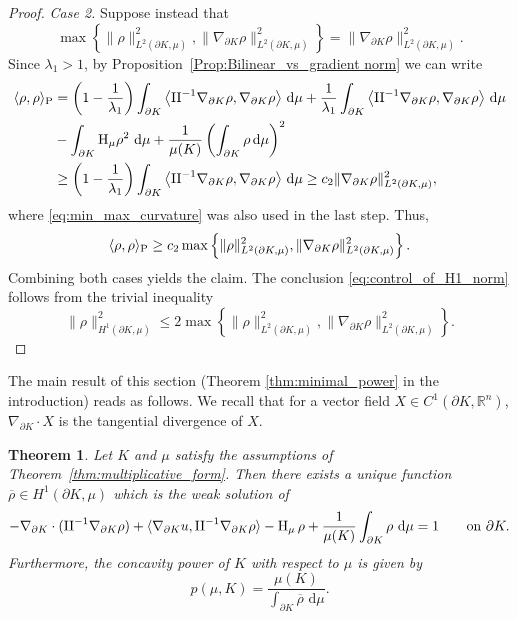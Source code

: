 \documentclass[a4paper, 11pt]{article}
\newcommand{\R}{\mathbb{R}}
\newtheorem{theorem}{Theorem}[section]
\theoremstyle{definition}
\newcommand{\di}{\, \mathrm{d}}
\begin{document}
\begin{proof}
\smallskip
\noindent
\emph{Case 2.}
Suppose instead that
\[\max\left\{\|\rho\|^2_{L^2(\partial K, \mu)},\|\nabla_{\partial K}\rho\|^2_{L^2(\partial K, \mu)}\right\}=\|\nabla_{\partial K}\rho\|^2_{L^2(\partial K, \mu)}.\]
Since $\lambda_{1}>1$, by Proposition~\ref{Prop:Bilinear_vs_gradient norm} we can write
\begin{align}
\langle \rho,\rho \rangle_{\rm P}
&=\left(1-\frac{1}{\lambda_1}\right)\int_{\partial K} \left\langle {\rm II}^{-1}\nabla_{\partial K}\rho, \nabla_{\partial K} \rho \right\rangle \di \mu+ \frac{1}{\lambda_1}\int_{\partial K} \left\langle {\rm II}^{-1}\nabla_{\partial K}\rho, \nabla_{\partial K} \rho \right\rangle \di\mu  \notag \\
\notag &- \int_{\partial K}{\rm H}_\mu\rho^2\,\di\mu +\frac{1}{\mu(K)}\left( \int_{\partial K}\rho\di\mu \right)^2 \\
&\geq \left(1-\frac{1}{\lambda_1}\right)\int_{\partial K} \left\langle {\rm II}^{-1}\nabla_{\partial K}\rho,\nabla_{\partial K} \rho \right\rangle \di \mu
\geq c_2 \|\nabla_{\partial K}\rho\|^2_{L^2(\partial K, \mu)},
\end{align}
where \eqref{eq:min_max_curvature} was also used in the last step. Thus,
\begin{equation}\label{eq:coercivity_case_2}
\langle \rho,\rho \rangle_{\rm P}\geq c_2 \max\left\{\|\rho\|^2_{L^2(\partial K, \mu)},\|\nabla_{\partial K}\rho\|^2_{L^2(\partial K, \mu)}\right\}.
\end{equation}
Combining both cases yields the claim. The conclusion \eqref{eq:control_of_H1_norm} follows from the trivial inequality
\[\|\rho\|^2_{H^{1}(\partial K,\mu)}\leq 2\max\left\{\|\rho\|^2_{L^2(\partial K, \mu)},\|\nabla_{\partial K}\rho\|^2_{L^2(\partial K, \mu)}\right\}.\]
\end{proof}

\medskip

The main result of this section (Theorem \ref{thm:minimal_power} in the introduction) reads as follows. We recall that for a vector field $X \in C^1(\partial K,\R^n)$, $\nabla_{\partial K} \cdot X$ is the tangential divergence of $X$.
\begin{theorem}\label{thm:Section_4_main1}
Let $K$ and $\mu$ satisfy the assumptions of Theorem~\ref{thm:multiplicative_form}. Then there exists a unique function $\overline{\rho} \in H^{1}(\partial K,\mu)$ which is the weak solution of
\begin{equation}\label{eq:PDE_divergence_form}
-\nabla_{\partial K} \cdot ({\rm II}^{-1}\nabla_{\partial K}\rho)+\langle \nabla_{\partial K}u,{\rm II}^{-1}\nabla_{\partial K}\rho \rangle -{\rm H}_\mu\,\rho+\frac{1}{\mu(K)}\int_{\partial K}\rho\,\di\mu=1\qquad\text{on }\partial K.
\end{equation}
Furthermore, the concavity power of $K$ with respect to $\mu$ is given by
\begin{equation}\label{eq:new_concavity expression}
p(\mu,K) = \frac{\mu(K)}{\int_{\partial K} \overline{\rho}\,\di\mu}.
\end{equation}
\end{theorem}
\end{document}
